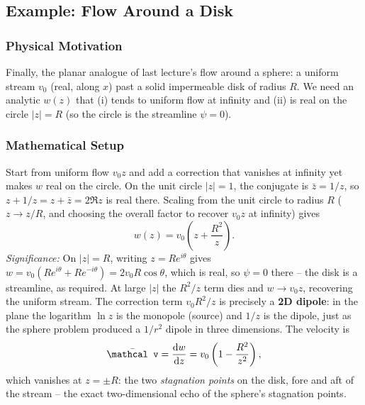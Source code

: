 \documentclass[../main.tex]{subfiles}
\begin{document}
\subsection{Example: Flow Around a Disk}\label{sec:lec17:disk}

\subsubsection*{Physical Motivation}
Finally, the planar analogue of last lecture's flow around a sphere: a uniform stream $v_0$ (real, along $x$) past a solid impermeable disk of radius $R$. We need an analytic $w(z)$ that (i) tends to uniform flow at infinity and (ii) is real on the circle $|z|=R$ (so the circle is the streamline $\psi=0$).

\subsubsection*{Mathematical Setup}
Start from uniform flow $v_0 z$ and add a correction that vanishes at infinity yet makes $w$ real on the circle. On the unit circle $|z|=1$, the conjugate is $\bar z=1/z$, so $z+1/z=z+\bar z=2\Re z$ is real there. Scaling from the unit circle to radius $R$ ($z\to z/R$, and choosing the overall factor to recover $v_0 z$ at infinity) gives
\begin{equation}
  \boxed{w(z) = v_0\left(z + \frac{R^2}{z}\right).}
  \label{eq:lec17_disk_w}
\end{equation}
\textit{Significance:} On $|z|=R$, writing $z=Re^{i\theta}$ gives $w=v_0(Re^{i\theta}+Re^{-i\theta})=2v_0R\cos\theta$, which is real, so $\psi=0$ there -- the disk is a streamline, as required. At large $|z|$ the $R^2/z$ term dies and $w\to v_0 z$, recovering the uniform stream. The correction term $v_0 R^2/z$ is precisely a \textbf{2D dipole}: in the plane the logarithm $\ln z$ is the monopole (source) and $1/z$ is the dipole, just as the sphere problem produced a $1/r^2$ dipole in three dimensions. The velocity is
\begin{equation}
  \bar{\mathcal v} = \dv{w}{z} = v_0\left(1-\frac{R^2}{z^2}\right),
  \label{eq:lec17_disk_vel}
\end{equation}
which vanishes at $z=\pm R$: the two \emph{stagnation points} on the disk, fore and aft of the stream -- the exact two-dimensional echo of the sphere's stagnation points.
\end{document}
